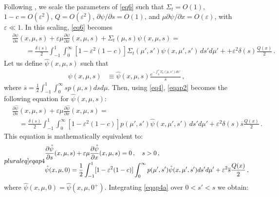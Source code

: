 \documentclass[12pt]{article}
\newcommand{\eps}{\varepsilon}
\begin{document}
{Following \cite{vaslar14a},  we scale the parameters of \cref{eq6} such that $\Sigma_t = O(1)$, 
$ 1-c = O(\varepsilon^2) $, $Q=O(\varepsilon^2)$,  $\partial \psi / \partial s = O(1)$, and $\mu \partial \psi/\partial x = O(\eps)$, with $\varepsilon \ll 1$. In this scaling, \cref{eq6} becomes
  \begin{align}
    &\frac{\partial \psi}{\partial s}  (x, \mu,s) 
      + \eps\mu\frac{\partial\psi}{\partial x}(x, \mu, s)
       + \Sigma_t(\mu,s) \psi( x, \mu, s)   = \label{eqap1}\\
   & \quad\quad= \frac{\delta(s)}{2}\int_{-1}^1\int_0^{\infty}[1-\eps^2(1-c)]\Sigma_t(\mu',s') 
      \psi(x, \mu', s') \, ds' d\mu' + + \varepsilon^2 \delta(s)\frac{Q(x)}{2}\nonumber \, .
  \end{align}
Let us define $\hat\psi( x, \mu, s)$ such that
  \begin{align}\label{eqap2}
   \psi( x, \mu, s) &\equiv 
          \hat\psi(x, \mu, s) \frac{e^{-\int_0^s \Sigma_t(\mu,s') ds'}}{\overline{s}}\,,
  \end{align}
where $\overline{s} = \frac{1}{2}\int_{-1}^1\int_0^\infty s p(\mu,s)dsd\mu$.
Then, using \cref{eq4}, \cref{eqap2} becomes the following equation for $\hat\psi(x, \mu, s)$:
  \begin{align}\label{eqap3}
    &\frac{\partial \hat\psi}{\partial s} (x, \mu,s) 
      + \varepsilon \mu\frac{\partial\hat\psi}{\partial x}(x,\mu, s)  = \\
   & \quad= \frac{\delta(s)}{2} \int_{-1}^1 \int_0^{\infty} [1-\eps^2(1-c)] p(\mu',s')
      \hat\psi(x, \mu', s') \, ds' d\mu'       + \varepsilon^2 \delta(s) \overline{s} \frac{Q(x)}{2} \,.\nonumber
  \end{align}
This equation is mathematically equivalent to:
   \begin{subequations}\label[pluraleq]{eqap4}
   \begin{align}
      &\frac{\partial \hat\psi}{\partial s} (x, \mu,s) 
         + \varepsilon \mu\frac{\partial\hat\psi}{\partial x}(x, \mu, s) = 0 \,, \quad s > 0 \,,\label{eqap4a}\\
       &\hat\psi(x, \mu, 0)  =\frac{1}{2}\int_{-1}^1 [1-\eps^2(1-c)] \int_0^{\infty} p(\mu',s')
\hat\psi(x, \mu', s') ds' d\mu' + \varepsilon^2 \overline{s} \frac{Q(x)}{2} \,,
   \end{align}
   \end{subequations}
where $\hat\psi(x,\mu,0) = \hat\psi(x,\mu,0^+)$. Integrating \cref{eqap4a} over $0 < s' < s$ we obtain:
   \begin{align}

\end{align}}
\end{document}
